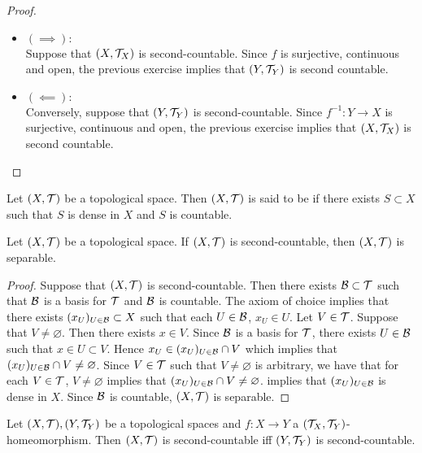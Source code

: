 \documentclass{book}
\begin{document}
	\begin{proof}\
		\begin{itemize}
			\item $(\implies):$ \\
			Suppose that $(X, \mathcal{T}_X)$ is second-countable. Since $f$ is surjective, continuous and open, the previous exercise implies that $(Y, \mathcal{T}_Y)$ is second countable.
			\item $(\impliedby):$ \\
			Conversely, suppose that $(Y, \mathcal{T}_Y)$ is second-countable. Since $f^{-1}: Y \rightarrow X$ is  surjective, continuous and open, the previous exercise implies that $(X, \mathcal{T}_X)$ is second countable.
		\end{itemize}
	\end{proof}

	\begin{defn} 
		Let $(X, \mathcal{T})$ be a topological space. Then $(X, \mathcal{T})$ is said to be  if there exists $S \subset X$ such that $S$ is dense in $X$ and $S$ is countable.
	\end{defn}

	\begin{ex} 
		Let $(X, \mathcal{T})$ be a topological space. If $(X, \mathcal{T})$ is second-countable, then $(X, \mathcal{T})$ is separable. 
	\end{ex}

	\begin{proof}
		Suppose that $(X, \mathcal{T})$ is second-countable. Then there exists $\mathcal{B} \subset \mathcal{T}$ such that $\mathcal{B}$ is a basis for $\mathcal{T}$ and $\mathcal{B}$ is countable. The axiom of choice implies that there exists $(x_U)_{U \in \mathcal{B}} \subset X$ such that each $U \in \mathcal{B}$, $x_U \in U$. Let $V \in \mathcal{T}$. Suppose that $V \neq \varnothing$. Then there exists $x \in V$. Since $\mathcal{B}$ is a basis for $\mathcal{T}$, there exists $U \in \mathcal{B}$ such that $x \in U \subset V$. Hence $x_U \in (x_U)_{U \in \mathcal{B}} \cap V$ which implies that $(x_U)_{U \in \mathcal{B}} \cap V \neq \varnothing$. Since $V \in \mathcal{T}$ such that $V \neq \varnothing$ is arbitrary, we have that for each $V \in \mathcal{T}$, $V \neq \varnothing$ implies that $(x_U)_{U \in \mathcal{B}} \cap V \neq \varnothing$. \rex{31022} implies that $(x_U)_{U \in \mathcal{B}}$ is dense in $X$. Since $\mathcal{B}$ is countable, $(X, \mathcal{T})$ is separable.
	\end{proof}

	\begin{ex} 
		Let $(X, \mathcal{T}), (Y, \mathcal{T}_Y)$ be a topological spaces and $f: X \rightarrow Y$ a $(\mathcal{T}_X, \mathcal{T}_Y)$-homeomorphism. Then $(X, \mathcal{T})$ is second-countable iff $(Y, \mathcal{T}_Y)$ is second-countable.
	\end{ex}
\end{document}
